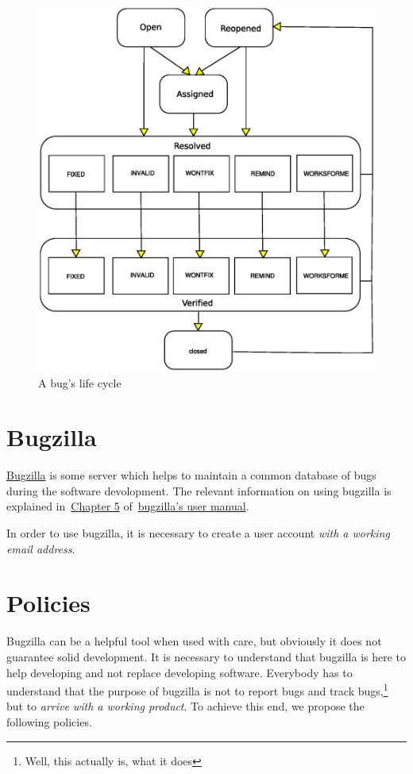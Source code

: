 \documentclass[11pt,nologo,handout]{handout}
\begin{document}
\begin{figure}
  \centering
  \includegraphics[width=.5\textwidth]{bug-life-cycle}
  \caption{A bug's life cycle}
  \label{fig:lifecycle}
\end{figure}






\section{Bugzilla}

\href{http://www.bugzilla.org}{Bugzilla} is some server which helps to
maintain a common database of bugs during the software devolopment.  The
relevant information on using bugzilla is explained
in~\href{http://www.bugzilla.org/docs/2.18/html/using-intro.html}{Chapter 5}
of~\href{http://www.bugzilla.org/docs/2.18/html/}{bugzilla's user manual}.

In order to use bugzilla, it is necessary to create a user account
\emph{with a working email address}.





\section{Policies}

Bugzilla can be a helpful tool when used with care, but obviously it does
not guarantee solid development.  It is necessary to understand that
bugzilla is here to help developing and not replace developing software.
Everybody has to understand that the purpose of bugzilla is not to
report bugs and track bugs,\footnote{Well, this actually is, what it does}
but to \emph{arrive with a working product}.  To achieve this end, we
propose the following policies.
\end{document}
